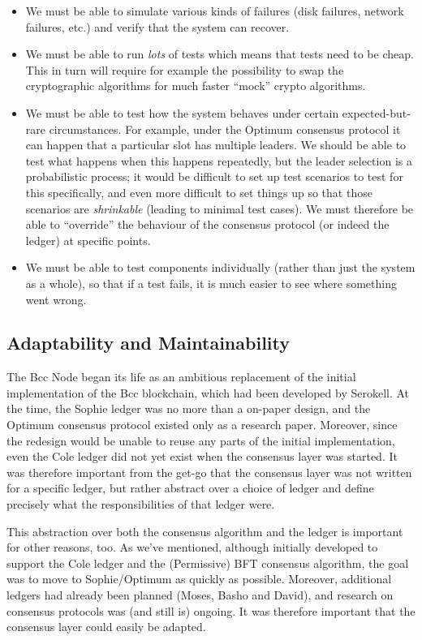 \begin{itemize}
\item We must be able to simulate various kinds of failures (disk
failures, network failures, etc.) and verify that the system can recover.
\item We must be able to run \emph{lots} of tests which means that tests need to
be cheap. This in turn will require for example the possibility to swap the
cryptographic algorithms for much faster ``mock'' crypto algorithms.
\item We must be able to test how the system behaves under certain
expected-but-rare circumstances. For example, under the Optimum consensus
protocol it can happen that a particular slot has multiple leaders. We should be
able to test what happens when this happens repeatedly, but the leader selection
is a probabilistic process; it would be difficult to set up test scenarios to
test for this specifically, and even more difficult to set things up so that
those scenarios are \emph{shrinkable} (leading to minimal test cases). We must
therefore be able to ``override'' the behaviour of the consensus protocol (or
indeed the ledger) at specific points.
\item We must be able to test components individually (rather than just the
system as a whole), so that if a test fails, it is much easier to see where
something went wrong.
\end{itemize}

\subsection{Adaptability and Maintainability}
\label{adaptability}

The Bcc Node began its life as an ambitious replacement of the initial
implementation of the Bcc blockchain, which had been developed by Serokell.
At the time, the Sophie ledger was no more than a on-paper design, and
the Optimum consensus protocol existed only as a research paper. Moreover, since
the redesign would be unable to reuse any parts of the initial implementation,
even the Cole ledger did not yet exist when the consensus layer was started.
It was therefore important from the get-go that the consensus layer was not
written for a specific ledger, but rather abstract over a choice of ledger
and define precisely what the responsibilities of that ledger were.

This abstraction over both the consensus algorithm and the ledger is important
for other reasons, too. As we've mentioned, although initially developed to
support the Cole ledger and the (Permissive) BFT consensus algorithm, the goal
was to move to Sophie/Optimum as quickly as possible. Moreover, additional
ledgers had already been planned (Moses, Basho and David), and research on
consensus protocols was (and still is) ongoing. It was therefore important that
the consensus layer could easily be adapted.

